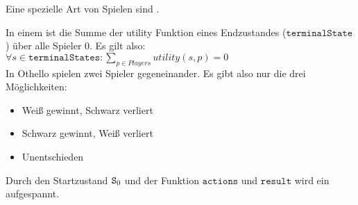 Eine spezielle Art von Spielen sind .
\begin{Definition}
In einem  ist die Summe der utility Funktion eines Endzustandes ($\mathtt{terminalState}$) über alle Spieler 0. Es gilt also:
\vspace{0.2cm}
\\$\forall s \in \mathtt{terminalStates}: \sum\limits_{p \in Players} utility(s, p) = 0$
\vspace{0.2cm}
\\In Othello spielen zwei Spieler gegeneinander. Es gibt also nur die drei Möglichkeiten:
\begin{itemize}
\item Weiß gewinnt, Schwarz verliert
\item Schwarz gewinnt, Weiß verliert
\item Unentschieden
\end{itemize}
\end{Definition}
Durch den Startzustand $\mathtt{S\textsubscript{0}}$ und der Funktion $\mathtt{actions}$ und $\mathtt{result}$ wird ein  aufgespannt.
